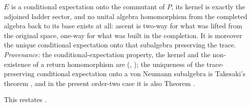$E$ is a conditional expectation onto the commutant of $P$, its kernel is exactly the adjoined ladder sector, and no unital algebra homomorphism from the completed algebra back to its base exists at all: ascent is two-way for what was lifted from the original space, one-way for what was built in the completion. It is moreover the unique conditional expectation onto that subalgebra preserving the trace. \emph{Provenance:} the conditional-expectation property, the kernel and the non-existence of a return homomorphism are \cite[Prop.~7.5, Thm.~7.6]{ButlerT1} (, ); the uniqueness of the trace-preserving conditional expectation onto a von Neumann subalgebra is Takesaki's theorem \cite{Takesaki1972}, and in the present order-two case it is also Theorem .

This restates .
